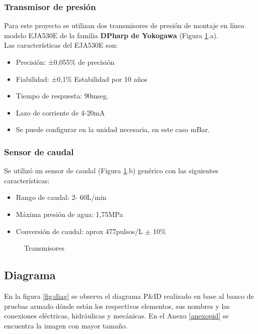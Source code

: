 \subsubsection{Transmisor de presión}
Para este proyecto se utilizan dos transmisores de presión de montaje en línea modelo EJA530E de la familia  \textbf{DPharp de Yokogawa} (Figura \ref{fig:transd}.a).\\
Las características del EJA530E son:
\begin{itemize}
	\item Precisión: ±0,055\% de precisión
	\item Fiabilidad: ±0,1\% Estabilidad por 10 años
	\item Tiempo de respuesta: 90mseg.
	\item Lazo de corriente de 4-20mA
	\item Se puede configurar en la unidad necesaria, en este caso mBar.
\end{itemize}


\subsubsection{Sensor de caudal}
Se utilizó un sensor de caudal (Figura \ref{fig:transd}.b) genérico con las siguientes características:
\begin{itemize}
	\item Rango de caudal: 2- 60L/min
	\item Máxima presión de agua: 1,75MPa
	\item Conversión de caudal: aprox 477pulsos/L $\pm$ 10\%
\end{itemize}


\begin{figure}[htbp]
	\centering
	\caption{Transmisores} \label{fig:transd}
\end{figure}





\subsection{Diagrama}
En la figura \ref{fig:diag} se observa el diagrama P\&ID realizado en base al banco de pruebas armado dónde están los respectivos elementos, sus nombres y las conexiones eléctricas, hidráulicas y mecánicas. En el Anexo \ref{anexopid} se encuentra la imagen con mayor tamaño.

